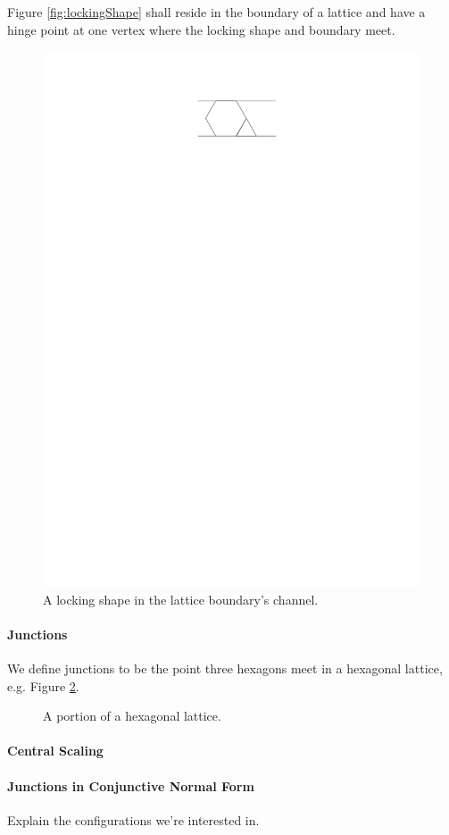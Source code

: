 Figure \ref{fig:lockingShape} shall reside in the boundary of a lattice and have
a hinge point at one vertex where the locking shape and boundary meet.
\begin{figure}[h]
\begin{center}
\includegraphics{graphics/shapeInChannel.pdf}
\end{center} 
\caption{A locking shape in the lattice boundary's channel.}
\label{fig:lockingShapeInChannel}
\end{figure}
\paragraph{Junctions}
We define junctions to be the point three hexagons meet in a hexagonal lattice,
e.g. Figure \ref{fig:lattice}.
\newdimen\R
\R=4.5cm
\begin{figure}[h] 
\begin{center}
\caption{A portion of a hexagonal lattice.}
\label{fig:lattice}
\end{center}
\end{figure}
\newpage
\paragraph{Central Scaling}
\paragraph{Junctions in Conjunctive Normal Form}
Explain the configurations we're interested in.

